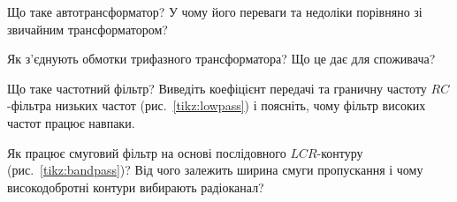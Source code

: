 \begin{Questions}
\begin{quizlist}
	\item Що таке автотрансформатор? У чому його переваги та недоліки порівняно зі звичайним трансформатором?
	\item Як з'єднують обмотки трифазного трансформатора? Що це дає для споживача?
	\item Що таке частотний фільтр? Виведіть коефіцієнт передачі та граничну частоту $RC$-фільтра низьких частот (рис.~\ref{tikz:lowpass}) і поясніть, чому фільтр високих частот працює навпаки.
	\item Як працює смуговий фільтр на основі послідовного $LCR$-контуру (рис.~\ref{tikz:bandpass})? Від чого залежить ширина смуги пропускання і чому високодобротні контури вибирають радіоканал?
\end{quizlist}
\end{Questions}

